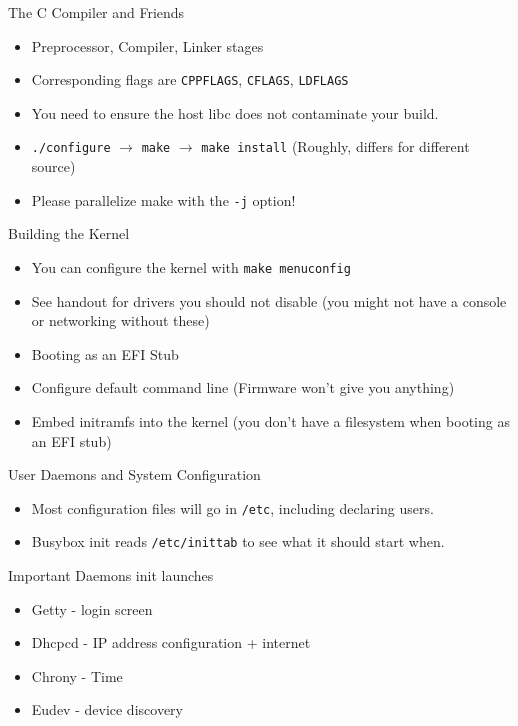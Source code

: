 \documentclass{../lecture}
\begin{document}
\begin{frame}{The C Compiler and Friends}
  \begin{itemize}
    \item Preprocessor, Compiler, Linker stages
    \item Corresponding flags are \texttt{CPPFLAGS}, \texttt{CFLAGS}, \texttt{LDFLAGS}
    \item You need to ensure the host libc does not contaminate your build.
    \item \texttt{./configure} $\rightarrow$ \texttt{make} $\rightarrow$
      \texttt{make install} (Roughly, differs for different source)
    \item Please parallelize make with the \texttt{-j} option!
  \end{itemize}
\end{frame}

\begin{frame}{Building the Kernel}
  \begin{itemize}
    \item You can configure the kernel with \texttt{make menuconfig}
    \item See handout for drivers you should not disable (you might not have a
      console or networking without these)
    \item Booting as an EFI Stub
    \item Configure default command line (Firmware won't give you anything)
    \item Embed initramfs into the kernel (you don't have a filesystem when
      booting as an EFI stub)
  \end{itemize}
\end{frame}

\begin{frame}{User Daemons and System Configuration}
  \begin{itemize}
    \item Most configuration files will go in \texttt{/etc}, including declaring
      users.
    \item Busybox init reads \texttt{/etc/inittab} to see what it should start
      when.
  \end{itemize}
  \begin{block}{Important Daemons init launches}
    \begin{itemize}
      \item Getty - login screen
      \item Dhcpcd - IP address configuration + internet
      \item Chrony - Time
      \item Eudev - device discovery
    \end{itemize}
  \end{block}
\end{frame}
\end{document}
